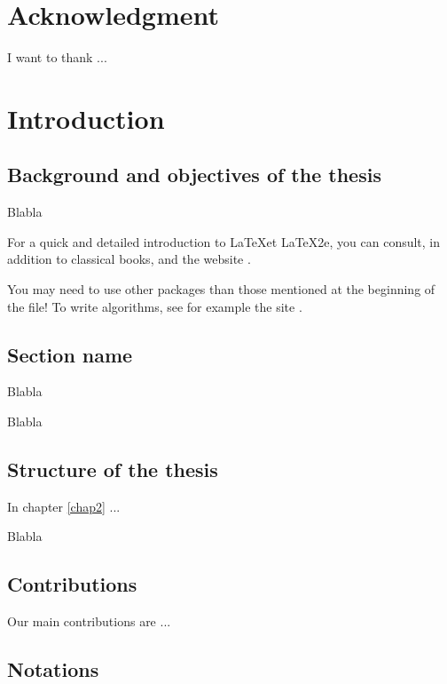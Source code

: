 \documentclass[11pt,a4paper,oneside]{book}
\begin{document}
\chapter*{Acknowledgment}
\thispagestyle{empty} 

\noindent I want to thank ...

\thispagestyle{empty} 
\setcounter{page}{0}
\tableofcontents
\mainmatter 
\chapter{Introduction}
\setcounter{page}{1}

\vspace*{0.5cm}

\section{Background and objectives of the thesis}

Blabla

For a quick and detailed introduction to  \LaTeX et \LaTeX2e, you can consult, in addition to classical books, \cite{lamp,mittel} and the website \cite{oetik}.

You may need to use other packages than those mentioned at the beginning of the file! To write algorithms, see for example the site \cite{fiorio}.

\section{Section name}

Blabla

Blabla

\section{Structure of the thesis}

In chapter \ref{chap2} ...

Blabla

\section{Contributions}

Our main contributions are ...\vspace{1cm}

\clearpage
\section{Notations}
\end{document}

